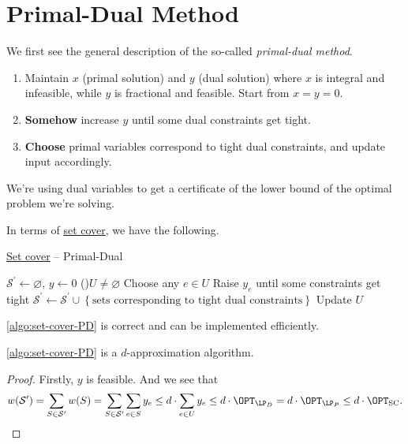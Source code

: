 \section{Primal-Dual Method}

We first see the general description of the so-called \emph{primal-dual method}.

\begin{enumerate}
	\item Maintain \(x\) (primal solution) and \(y\) (dual solution) where \(x\) is integral and infeasible, while \(y\) is fractional and feasible. Start from \(x = y = 0\).
	\item \textbf{Somehow} increase \(y\) until some dual constraints get tight.
	\item \textbf{Choose} primal variables correspond to tight dual constraints, and update input accordingly.
\end{enumerate}

\begin{remark}
	We're using dual variables to get a certificate of the lower bound of the optimal problem we're solving.
\end{remark}

In terms of \hyperref[prb:set-cover]{set cover}, we have the following.

\begin{algorithm}[H]\label{algo:set-cover-PD}
	\DontPrintSemicolon
	\caption{\hyperref[prb:set-cover]{Set cover} -- Primal-Dual}
	\BlankLine

	\(\mathcal{S} ^\prime \gets \varnothing\), \(y \gets 0\)\;
	\While(){\(U \neq \varnothing \)}{
		Choose any \(e\in U\)\;
		Raise \(y_e\) until some constraints get tight\;
		\(\mathcal{S} ^\prime \gets \mathcal{S} ^\prime \cup \left\{ \text{sets corresponding to tight dual constraints} \right\} \)\;
		Update \(U\)
	}
	\;
\end{algorithm}

\begin{remark}
	\autoref{algo:set-cover-PD} is correct and can be implemented efficiently.
\end{remark}

\begin{theorem}
	\autoref{algo:set-cover-PD} is a \(d\)-approximation algorithm.
\end{theorem}
\begin{proof}
	Firstly, \(y\) is feasible. And we see that
	\[
		w(\mathcal{S} ^\prime ) = \sum_{S\in \mathcal{S} ^\prime } w(S) = \sum_{S\in \mathcal{S} ^\prime }\sum_{e\in S}y_e \leq d\cdot \sum_{e\in U} y_e \leq d\cdot \OPT_{\LP_{D}} = d\cdot \OPT_{\LP_P}\leq d\cdot \OPT_{\mathrm{SC} }.
	\]
\end{proof}